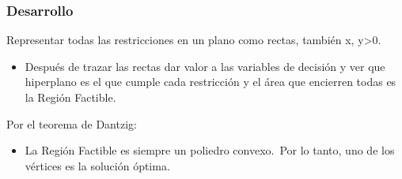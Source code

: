 \documentclass[12pt, twoside, openright]{report} %
\begin{document}
	\subsubsection{Desarrollo}

	
      Representar todas las restricciones en un plano como rectas,
      también x, y\textgreater0.

      \begin{itemize}
    
      \item
        Después de trazar las rectas dar valor a las variables de
        decisión y ver que hiperplano es el que cumple cada restricción
        y el área que encierren todas es la Región Factible.
      \end{itemize}

	  Por el teorema de Dantzig:

      \begin{itemize}
    
      \item
        La Región Factible es siempre un poliedro convexo.~Por lo tanto,
        uno de los vértices es la solución óptima.
      \end{itemize}
\end{document}
